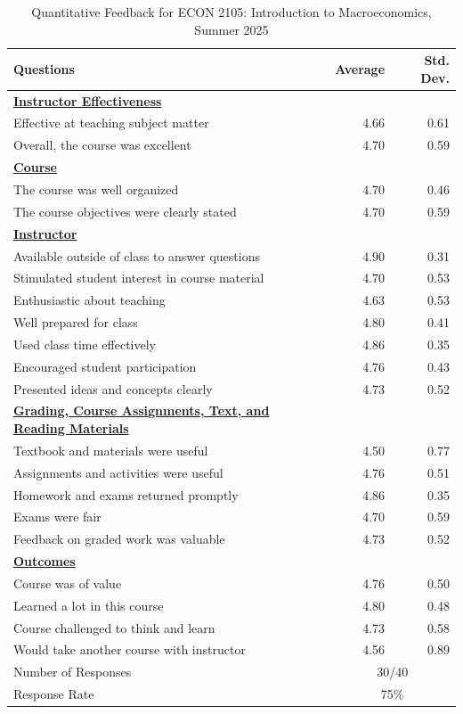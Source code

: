 \documentclass[11pt]{article}
\begin{document}
\begin{table}[H]
\centering
\caption{Quantitative Feedback for ECON 2105: Introduction to Macroeconomics, Summer 2025}
\begin{tabular}{@{}p{}rr@{}}
\toprule
\textbf{Questions} & \textbf{Average} & \textbf{Std. Dev.} \\
\midrule
\textbf{\underline{Instructor Effectiveness}} & & \\
Effective at teaching subject matter & 4.66 & 0.61 \\
Overall, the course was excellent & 4.70 & 0.59 \\
\textbf{\underline{Course}} & & \\
The course was well organized & 4.70& 0.46 \\
The course objectives were clearly stated & 4.70 & 0.59 \\
\addlinespace
\textbf{\underline{Instructor}} & & \\
Available outside of class to answer questions & 4.90 & 0.31 \\
Stimulated student interest in course material & 4.70 & 0.53 \\
Enthusiastic about teaching& 4.63 & 0.53 \\
Well prepared for class & 4.80 & 0.41 \\
Used class time effectively & 4.86 & 0.35 \\
Encouraged student participation & 4.76 & 0.43 \\
Presented ideas and concepts clearly & 4.73 & 0.52 \\
\addlinespace
\textbf{\underline{Grading, Course Assignments, Text, and Reading Materials}} & & \\
Textbook and materials were useful & 4.50 & 0.77 \\
Assignments and activities were useful & 4.76 & 0.51 \\
Homework and exams returned promptly& 4.86 & 0.35 \\
Exams were fair & 4.70 & 0.59 \\
Feedback on graded work was valuable & 4.73 & 0.52 \\
\addlinespace
\textbf{\underline{Outcomes}} & & \\
Course was of value & 4.76 & 0.50 \\
Learned a lot in this course & 4.80 & 0.48 \\
Course challenged to think and learn & 4.73 & 0.58 \\
Would take another course with instructor & 4.56 & 0.89 \\
\midrule
Number of Responses & \multicolumn{2}{c}{30/40} \\
Response Rate & \multicolumn{2}{c}{75\%} \\
\bottomrule
\end{tabular}
\end{table}
\end{document}
